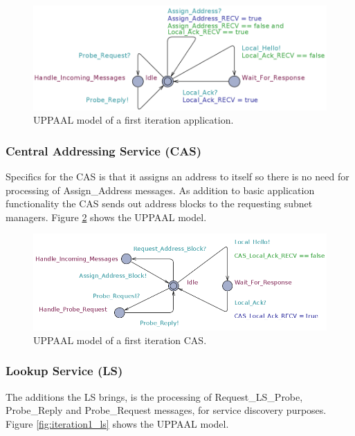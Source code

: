 \begin{figure}[h]
    \centering
    \includegraphics[width=\textwidth]{figures/iteration1_application}
    \caption{UPPAAL model of a first iteration application.}
    \label{fig:iteration1_application}
\end{figure}

\subsubsection{Central Addressing Service (CAS)}
Specifics for the CAS is that it assigns an address to itself so there is no
need for processing of Assign\_Address messages. As addition to basic
application functionality the CAS sends out address blocks to the requesting
subnet managers. Figure \ref{fig:iteration1_cas} shows the UPPAAL model.

\begin{figure}[h]
    \centering
    \includegraphics[width=\textwidth]{figures/iteration1_cas}
    \caption{UPPAAL model of a first iteration CAS.}
    \label{fig:iteration1_cas}
\end{figure}

\subsubsection{Lookup Service (LS)}
The additions the LS brings, is the processing of Request\_LS\_Probe,
Probe\_Reply and Probe\_Request messages, for service discovery purposes.
Figure \ref{fig:iteration1_ls} shows the UPPAAL model.

